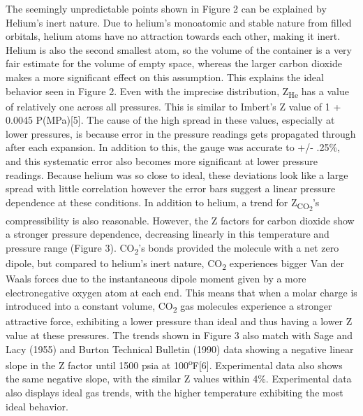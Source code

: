 \documentclass{article}
\begin{document}
\noindent The seemingly unpredictable points shown in Figure 2 can be explained by Helium's inert nature. Due to helium's monoatomic and stable nature from filled orbitals, helium atoms have no attraction towards each other, making it inert. Helium is also the second smallest atom, so the volume of the container is a very fair estimate for the volume of empty space, whereas the larger carbon dioxide makes a more significant effect on this assumption. This explains the ideal behavior seen in Figure 2. Even with the imprecise distribution, Z{{\textsubscript{He}}} has a value of relatively one across all pressures. This is similar to Imbert's Z value of 1 + 0.0045 P(MPa)[5]. The cause of the high spread in these values, especially at lower pressures, is because error in the pressure readings gets propagated through after each expansion. In addition to this, the gauge was accurate to +/- .25\%, and this systematic error also becomes more significant at lower pressure readings. Because helium was so close to ideal, these deviations look like a large spread with little correlation however the error bars suggest a linear pressure dependence at these conditions. \linebreak
\linebreak
In addition to helium, a trend for Z{{\textsubscript{CO{{\textsubscript{2}}}}}}'s compressibility is also reasonable. However, the Z factors for carbon dioxide show a stronger pressure dependence, decreasing linearly in this temperature and pressure range (Figure 3). CO{{\textsubscript{2}}}'s bonds provided the molecule with a net zero dipole, but compared to helium's inert nature, CO{{\textsubscript{2}}} experiences  bigger Van der Waals forces due to the instantaneous dipole moment given by a more electronegative oxygen atom at each end. This means that when a molar charge is introduced into a constant volume, CO{{\textsubscript{2}}} gas molecules experience a stronger attractive force, exhibiting a lower pressure than ideal and thus having a lower Z value at these pressures. The trends shown in Figure 3 also match with Sage and Lacy (1955) and Burton Technical Bulletin (1990) data showing a negative linear slope in the Z factor until 1500 psia at 100{\textsuperscript{o}}F[6]. Experimental data also shows the same negative slope, with the similar Z values within 4\%. Experimental data also displays ideal gas trends, with the higher temperature exhibiting the most ideal behavior.
\end{document}
